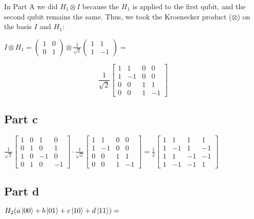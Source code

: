 \documentclass{article}
\begin{document}
In Part A we did $H_1\otimes I$ because the $H_1$ is applied to the first qubit, and the second qubit remains the same.  Thus, we took the Kroenecker product ($\otimes$) on the basis $I$ and $H_1$:

$I \otimes H_1 = (\begin{smallmatrix} 1&0\\0&1 \end{smallmatrix}) \otimes \frac1{\sqrt2}(\begin{smallmatrix} 1&1\\1&-1 \end{smallmatrix})=$

\[
\frac1{\sqrt2}
\begin{bmatrix}
1 & 1 & 0 & 0\\
1 & -1 & 0 & 0\\
0 & 0 & 1 & 1\\
0 & 0 & 1 & -1
\end{bmatrix}
\]


\subsection{Part c}

$
\frac1{\sqrt2}
\begin{bmatrix}
1 & 0 & 1 & 0\\
0 & 1 & 0 & 1\\
1 & 0 & -1 & 0\\
0 & 1 & 0 & -1
\end{bmatrix}
\cdot
\frac1{\sqrt2}
\begin{bmatrix}
1 & 1 & 0 & 0\\
1 & -1 & 0 & 0\\
0 & 0 & 1 & 1\\
0 & 0 & 1 & -1
\end{bmatrix}
=
\frac12
\begin{bmatrix}
1 & 1 & 1 & 1\\
1 & -1 & 1 & -1\\
1 & 1 & -1 & -1\\
1 & -1 & -1 & 1
\end{bmatrix}$


\subsection{Part d}


$H_2(a\ket{00} + b\ket{01} + c\ket{10} + d\ket{11}) = $
\end{document}
